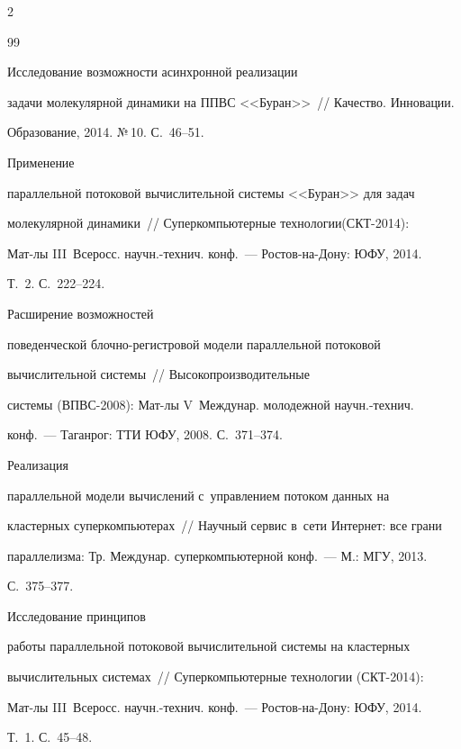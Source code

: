 \begin{multicols}{2}
{{\begin{thebibliography}{99}

   Исследование возможности асинхронной реализации 

задачи молекулярной динамики на ППВС <<Буран>>~// Качество. Инновации. 

Образование, 2014. №\,10. С.~46--51.

 


   Применение 

параллельной потоковой вы\-чис\-лительной сис\-те\-мы <<Буран>> для задач 

молекулярной динами\-ки~// Суперкомпьютерные технологии\linebreak (СКТ-2014):  

Мат-лы III~Всеросс. научн.-технич. конф.~--- Ростов-на-Дону: ЮФУ, 2014. 

Т.~2. С.~222--224.


   Рас\-ши\-ре\-ние возможностей 

поведенческой блоч\-но-ре\-гист\-ро\-вой модели параллельной потоковой 

вы\-чис\-ли\-тель\-ной системы~// Высокопроизводительные 

системы (ВПВС-2008): Мат-лы V~Междунар. молодежной научн.-технич. 

конф.~--- Таганрог: ТТИ ЮФУ, 2008. С.~371--374.


   Реализация 

параллельной модели вычислений с~управлением потоком данных на 

кластерных суперкомпьютерах~// Научный сервис в~сети Интернет: все грани 

параллелизма: Тр. Междунар. суперкомпьютерной конф.~--- М.: МГУ, 2013. 

С.~375--377.


   Исследование принципов 

работы параллельной потоковой вы\-чис\-ли\-тель\-ной системы на кластерных 

вычислительных системах~// Суперкомпьютерные технологии (СКТ-2014): 

Мат-лы III~Всеросс. научн.-технич. конф.~--- Рос\-тов-на-До\-ну: ЮФУ, 2014. 

Т.~1. С.~45--48.

 \end{thebibliography}



 }

 }



\end{multicols}
